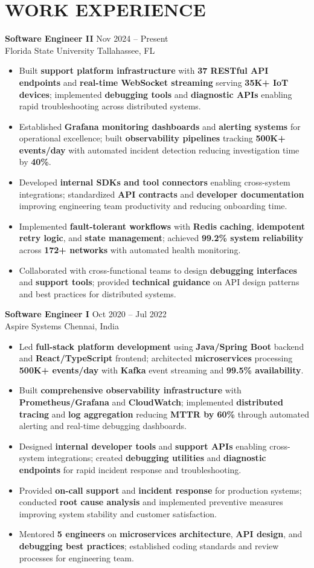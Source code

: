 \documentclass[letterpaper,10pt]{article}
\newcommand{\resumeItem}[1]{\item\small #1}
\newcommand{\resumeSubheading}[4]{
  \vspace{6pt}
  \noindent
  \textbf{#1} \hfill {\footnotesize #2} \\
  [-1pt]
  \noindent
  \small #3 \hfill {\small #4}
  \vspace{3pt}
}
\newcommand{\resumeItemsStart}{\vspace{-2pt}\begin{itemize}}
\newcommand{\resumeItemsEnd}{\end{itemize}\vspace{6pt}}
\begin{document}
\section{\textcolor{metablue}{WORK EXPERIENCE}}
\vspace{-12pt}

\resumeSubheading
{Software Engineer II}{Nov 2024 -- Present}
{Florida State University}{Tallahassee, FL}
\resumeItemsStart
\resumeItem{Built \textbf{support platform infrastructure} with \textbf{37 RESTful API endpoints} and \textbf{real-time WebSocket streaming} serving \textbf{35K+ IoT devices}; implemented \textbf{debugging tools} and \textbf{diagnostic APIs} enabling rapid troubleshooting across distributed systems.}
\resumeItem{Established \textbf{Grafana monitoring dashboards} and \textbf{alerting systems} for operational excellence; built \textbf{observability pipelines} tracking \textbf{500K+ events/day} with automated incident detection reducing investigation time by \textbf{40\%}.}
\resumeItem{Developed \textbf{internal SDKs and tool connectors} enabling cross-system integrations; standardized \textbf{API contracts} and \textbf{developer documentation} improving engineering team productivity and reducing onboarding time.}
\resumeItem{Implemented \textbf{fault-tolerant workflows} with \textbf{Redis caching}, \textbf{idempotent retry logic}, and \textbf{state management}; achieved \textbf{99.2\% system reliability} across \textbf{172+ networks} with automated health monitoring.}
\resumeItem{Collaborated with cross-functional teams to design \textbf{debugging interfaces} and \textbf{support tools}; provided \textbf{technical guidance} on API design patterns and best practices for distributed systems.}
\resumeItemsEnd
\vspace{-12pt}

\resumeSubheading
{Software Engineer I}{Oct 2020 -- Jul 2022}
{Aspire Systems}{Chennai, India}
\resumeItemsStart
\resumeItem{Led \textbf{full-stack platform development} using \textbf{Java/Spring Boot} backend and \textbf{React/TypeScript} frontend; architected \textbf{microservices} processing \textbf{500K+ events/day} with \textbf{Kafka} event streaming and \textbf{99.5\% availability}.}
\resumeItem{Built \textbf{comprehensive observability infrastructure} with \textbf{Prometheus/Grafana} and \textbf{CloudWatch}; implemented \textbf{distributed tracing} and \textbf{log aggregation} reducing \textbf{MTTR by 60\%} through automated alerting and real-time debugging dashboards.}
\resumeItem{Designed \textbf{internal developer tools} and \textbf{support APIs} enabling cross-system integrations; created \textbf{debugging utilities} and \textbf{diagnostic endpoints} for rapid incident response and troubleshooting.}
\resumeItem{Provided \textbf{on-call support} and \textbf{incident response} for production systems; conducted \textbf{root cause analysis} and implemented preventive measures improving system stability and customer satisfaction.}
\resumeItem{Mentored \textbf{5 engineers} on \textbf{microservices architecture}, \textbf{API design}, and \textbf{debugging best practices}; established coding standards and review processes for engineering team.}
\resumeItemsEnd
\vspace{-12pt}
\end{document}
